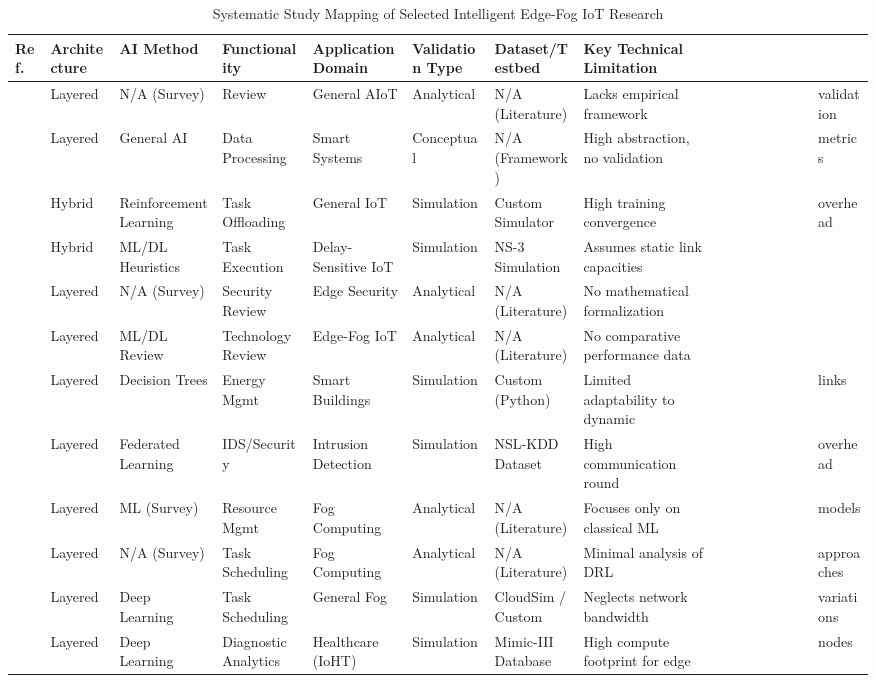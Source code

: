 \documentclass[conference]{IEEEtran}
\begin{document}
\begin{table}[p]
\centering
\caption{Systematic Study Mapping of Selected Intelligent Edge-Fog IoT Research}
\label{tab:study_mapping}
\scriptsize
\begin{tabular}{llllllll}
\toprule
\textbf{Ref.} & \textbf{Architecture} & \textbf{AI Method} & \textbf{Functionality} & \textbf{Application Domain} & \textbf{Validation Type} & \textbf{Dataset/Testbed} & \textbf{Key Technical Limitation} \\
\midrule
\cite{b1} & Layered & N/A (Survey) & Review & General AIoT & Analytical & N/A (Literature) & Lacks empirical framework &&&&&&&& validation \\
\cite{b2} & Layered & General AI & Data Processing & Smart Systems & Conceptual & N/A (Framework) & High abstraction, no validation &&&&&&&& metrics \\
\cite{b3} & Hybrid & Reinforcement Learning & Task Offloading & General IoT & Simulation & Custom Simulator & High training convergence &&&&&&&& overhead \\
\cite{b4} & Hybrid & ML/DL Heuristics & Task Execution & Delay-Sensitive IoT & Simulation & NS-3 Simulation & Assumes static link capacities \\
\cite{b5} & Layered & N/A (Survey) & Security Review & Edge Security & Analytical & N/A (Literature) & No mathematical formalization \\
\cite{b6} & Layered & ML/DL Review & Technology Review & Edge-Fog IoT & Analytical & N/A (Literature) & No comparative performance data \\
\cite{b7} & Layered & Decision Trees & Energy Mgmt & Smart Buildings & Simulation & Custom (Python) & Limited adaptability to dynamic &&&&&&&& links \\
\cite{b8} & Layered & Federated Learning & IDS/Security & Intrusion Detection & Simulation & NSL-KDD Dataset & High communication round  &&&&&&&& overhead \\
\cite{b9} & Layered & ML (Survey) & Resource Mgmt & Fog Computing & Analytical & N/A (Literature) & Focuses only on classical ML  &&&&&&&& models \\
\cite{b10} & Layered & N/A (Survey) & Task Scheduling & Fog Computing & Analytical & N/A (Literature) & Minimal analysis of DRL &&&&&&&& approaches \\
\cite{b11} & Layered & Deep Learning & Task Scheduling & General Fog & Simulation & CloudSim / Custom & Neglects network bandwidth &&&&&&&& variations \\
\cite{b12} & Layered & Deep Learning & Diagnostic Analytics & Healthcare (IoHT) & Simulation & Mimic-III Database & High compute footprint for edge &&&&&&&& nodes \\

\end{tabular}
\end{table}
\end{document}
